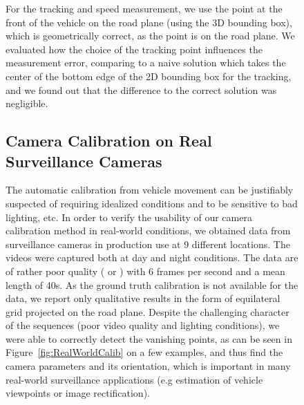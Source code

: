 \documentclass[]{elsarticle}
\begin{document}
\begin{figure}[h]
For the tracking and speed measurement, we use the point at the front of the vehicle on the road plane (using the 3D bounding box), which is geometrically correct, as the point is on the road plane. We evaluated how the choice of the tracking point influences the measurement error, comparing to a naive solution which takes the center of the bottom edge of the 2D bounding box for the tracking, and we found out that the difference to the correct solution was negligible.


\subsection{Camera Calibration on Real Surveillance Cameras}
\label{sec:RealCameras}

The automatic calibration from vehicle movement can be justifiably suspected of requiring idealized conditions and to be sensitive to bad lighting, etc.
In order to verify the usability of our camera calibration method in real-world conditions, we obtained data from surveillance cameras in production use at 9 different locations. The videos were captured both at day and night conditions. The data are of rather poor quality ( or ) with 6 frames per second and a mean length of 40s.
As the ground truth calibration is not available for the data, we report only qualitative results in the form of equilateral grid projected on the road plane.
Despite the challenging character of the sequences (poor video quality and lighting conditions), we were able to correctly detect the vanishing points, as can be seen in Figure~\ref{fig:RealWorldCalib} on a few examples, and thus find the camera parameters and its orientation, which is important in many real-world surveillance applications (e.g estimation of vehicle viewpoints or image rectification).


\end{figure}
\end{document}
